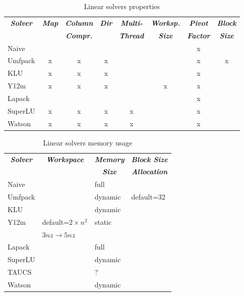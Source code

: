 \begin{table}
\centering
\caption{Linear solvers properties}\label{tab:linear-solvers-props}
\begin{tabular}{lccccccc}
\hline
	\multicolumn{1}{c}{\textbf{\emph{Solver}}} &
	\multicolumn{1}{c}{\textbf{\emph{Map}}} &
	\multicolumn{1}{c}{\textbf{\emph{Column}}} &
	\multicolumn{1}{c}{\textbf{\emph{Dir}}} &
	\multicolumn{1}{c}{\textbf{\emph{Multi-}}} &
	\multicolumn{1}{c}{\textbf{\emph{Worksp.}}} &
	\multicolumn{1}{c}{\textbf{\emph{Pivot}}} &
	\multicolumn{1}{c}{\textbf{\emph{Block}}} \\
	& & \multicolumn{1}{c}{\textbf{\emph{Compr.}}} &
	& \multicolumn{1}{c}{\textbf{\emph{Thread}}}
	& \multicolumn{1}{c}{\textbf{\emph{Size}}}
	& \multicolumn{1}{c}{\textbf{\emph{Factor}}}
	& \multicolumn{1}{c}{\textbf{\emph{Size}}} \\
\hline\hline
	Naive		& 	&	&	&	&	& x	&	\\
	Umfpack		& x	& x	& x	&	&	& x	& x	\\
	KLU		& x	& x	& x	&	&	& x	&	\\
	Y12m		& x	& x	& x	&	& x	& x	&	\\
	Lapack		&	&	&	&	&	& x	&	\\
	SuperLU		& x	& x	& x	& x	&	& x	&	\\
	Watson		& x	& x	& x	& x	&	& x	&	\\
\hline
\end{tabular}
\end{table}

\begin{table}
\centering
\caption{Linear solvers memory usage}\label{tab:linear-solvers-memory}
\begin{tabular}{llll}
\hline
	\multicolumn{1}{c}{\textbf{\emph{Solver}}} &
	\multicolumn{1}{c}{\textbf{\emph{Workspace}}} &
	\multicolumn{1}{c}{\textbf{\emph{Memory}}} &
	\multicolumn{1}{c}{\textbf{\emph{Block Size}}} \\
	&
	&
	\multicolumn{1}{c}{\textbf{\emph{Size}}} &
	\multicolumn{1}{c}{\textbf{\emph{Allocation}}} \\
\hline\hline
	Naive		& 			& full		&		\\
	Umfpack 	& 			& dynamic	& default=32	\\
	KLU 		& 			& dynamic	& 		\\
	Y12m 		& default=$2\times{n^2}$& static	&		\\
			& $3nz \rightarrow 5nz$	&		&		\\
	Lapack		&			& full		&		\\
	SuperLU		& 			& dynamic 	&		\\
	TAUCS		&			& ?		&		\\
	Watson		&			& dynamic	&		\\
\hline
\end{tabular}
\end{table}

